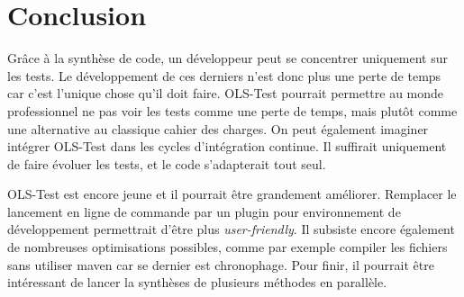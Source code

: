 \chapter*{Conclusion}
	\thispagestyle{conclusion}
	
\par Grâce à la synthèse de code, un développeur peut se concentrer uniquement sur les tests. Le développement de ces derniers n'est donc plus une perte de temps car c'est l'unique chose qu'il doit faire. OLS-Test pourrait permettre au monde professionnel ne pas voir les tests comme une perte de temps, mais plutôt comme une alternative au classique cahier des charges. On peut également imaginer intégrer OLS-Test dans les cycles d'intégration continue. Il suffirait uniquement de faire évoluer les tests, et le code s'adapterait tout seul.

\par OLS-Test est encore jeune et il pourrait être grandement améliorer. Remplacer le lancement en ligne de commande par un plugin pour environnement de développement permettrait d'être plus \textit{user-friendly}. Il subsiste encore également de nombreuses optimisations possibles, comme par exemple compiler les fichiers sans utiliser maven car se dernier est chronophage. Pour finir, il pourrait être intéressant de lancer la synthèses de plusieurs méthodes en parallèle.

\begin{center}
\end{center}
	
	

